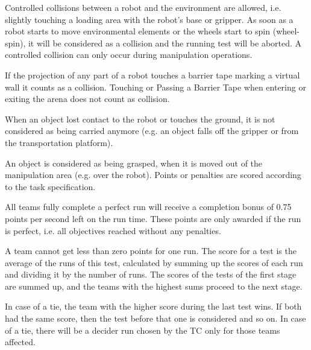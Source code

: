 Controlled collisions between a robot and the environment are allowed, i.e. slightly touching a loading area with the robot’s base or gripper. As soon as a robot starts to move environmental elements or the wheels start to spin (wheel-spin), it will be considered as a collision and the running test will be aborted. A controlled collision can only occur during manipulation operations.
\par
If the projection of any part of a robot touches a barrier tape marking a virtual wall it counts as a collision. Touching or Passing a Barrier Tape when entering or exiting the arena does not count as collision.
\par
When an object lost contact to the robot or touches the ground, it is not considered as being carried anymore (e.g. an object falls off the gripper or from the transportation platform).
\par
An object is considered as being grasped, when it is moved out of the manipulation area (e.g. over the robot). Points or penalties are scored according to the task specification.
\par
All teams fully complete a perfect run will receive a completion bonus of 0.75 points per second left on the run time. These points are only awarded if the run is perfect, i.e. all objectives reached without any penalties.
\par
A team cannot get less than zero points for one run. The score for a test is the average of the runs of this test, calculated by summing up the scores of each run and dividing it by the number of runs. The scores of the tests of the first stage are summed up, and the teams with the highest sums proceed to the next stage.
\par
In case of a tie, the team with the higher score during the last test wins. If both had the same score, then the test before that one is considered and so on. In case of a tie, there will be a decider run chosen by the TC only for those teams affected.
\par
\par

